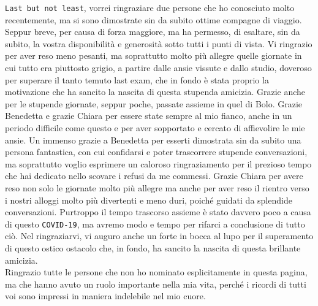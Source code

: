 \noindent \texttt{Last but not least}, vorrei ringraziare due persone che ho conosciuto molto recentemente, ma si sono dimostrate sin da subito ottime compagne di viaggio. Seppur breve, per causa di forza maggiore, ma ha permesso, di esaltare, sin da subito, la vostra disponibilità e generosità sotto tutti i punti di vista. Vi ringrazio per aver reso meno pesanti, ma soprattutto molto più allegre quelle giornate in cui tutto era piuttosto grigio, a partire dalle ansie vissute e dallo studio, doveroso per superare il tanto temuto last exam, che in fondo è stata proprio la motivazione che ha sancito la nascita di questa stupenda amicizia. Grazie anche per le stupende giornate, seppur poche, passate assieme in quel di Bolo. Grazie Benedetta e grazie Chiara per essere state sempre al mio fianco, anche in un periodo difficile come questo e per aver sopportato e cercato di affievolire le mie ansie. 
Un immenso grazie a Benedetta per esserti dimostrata sin da subito una persona fantastica, con cui confidarsi e poter trascorrere stupende conversazioni, ma soprattutto voglio esprimere un caloroso ringraziamento per il prezioso tempo che hai dedicato nello scovare i refusi da me commessi. 
Grazie Chiara per avere reso non solo le giornate molto più allegre ma anche per aver reso il rientro verso i nostri alloggi molto più divertenti e meno duri, poiché guidati da splendide conversazioni.
Purtroppo il tempo trascorso assieme è stato davvero poco a causa di questo \texttt{COVID-19}, ma avremo modo e tempo per rifarci a conclusione di tutto ciò. Nel ringraziarvi, vi auguro anche un forte in bocca al lupo per il superamento di questo ostico ostacolo che, in fondo, ha sancito la nascita di questa brillante amicizia.\\

\noindent Ringrazio tutte le persone che non ho nominato esplicitamente in questa pagina, ma che hanno avuto un ruolo importante nella mia vita, perché i ricordi di tutti voi sono impressi in maniera indelebile nel mio cuore.
